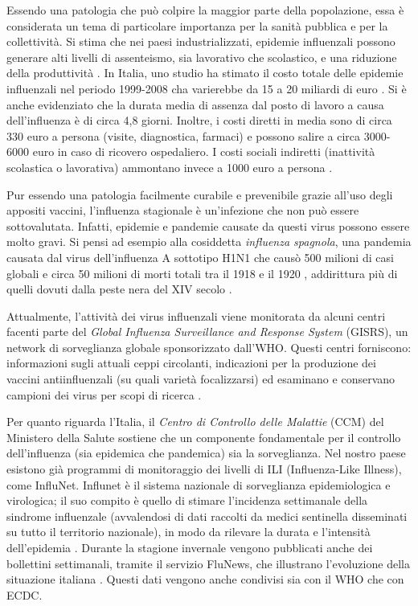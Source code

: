 Essendo una patologia che può colpire la maggior parte della popolazione, essa è considerata
un tema di particolare importanza per la sanità pubblica e per la collettività. Si stima che nei paesi industrializzati,
epidemie influenzali possono generare alti livelli di assenteismo, sia lavorativo che scolastico,
e una riduzione della produttività \cite{whoinfluenza_keyfacts}.
In Italia, uno studio ha stimato il costo totale delle epidemie influenzali nel periodo 1999-2008
cha varierebbe da 15 a 20 miliardi di euro \cite{PLLai2011}. Si è anche evidenziato che la durata media 
di assenza dal posto di lavoro a causa dell'influenza è di circa 4,8 giorni. 
Inoltre, i costi diretti in media sono di circa 330 euro a persona (visite, diagnostica, farmaci) e possono salire a circa 
3000-6000 euro in caso di ricovero ospedaliero.
I costi sociali indiretti (inattività scolastica o lavorativa) ammontano invece a 1000 euro a persona \cite{Sessa2005}.
\bigskip

Pur essendo una patologia facilmente curabile e prevenibile grazie all'uso degli appositi vaccini, 
l'influenza stagionale è un'infezione che non può essere sottovalutata. Infatti, epidemie e pandemie causate
da questi virus possono essere molto gravi. Si pensi ad esempio alla cosiddetta \textit{influenza spagnola},
una pandemia causata dal virus dell'influenza A sottotipo H1N1 che causò 500 milioni di casi globali e
circa 50 milioni di morti totali tra il 1918 e il 1920 \cite{taubenberger20061918}, addirittura più di quelli
dovuti dalla peste nera del XIV secolo \cite{JAM:JAM1492}.
\bigskip

Attualmente, l'attività dei virus influenzali viene monitorata da alcuni centri facenti
parte del \textit{Global Influenza Surveillance and Response System} (GISRS), un network di sorveglianza globale
sponsorizzato dall'WHO. Questi centri forniscono: informazioni sugli attuali ceppi circolanti, indicazioni
per la produzione dei vaccini antiinfluenzali (su quali varietà focalizzarsi) ed esaminano e conservano
campioni dei virus per scopi di ricerca \cite{whoinfluenza_surveillance}.
\bigskip

Per quanto riguarda l'Italia, il \textit{Centro di Controllo delle Malattie} (CCM) del Ministero della Salute sostiene
che un componente fondamentale per il controllo dell'influenza (sia epidemica che pandemica) sia la sorveglianza.
Nel nostro paese esistono già programmi di monitoraggio dei livelli di ILI (Influenza-Like Illness), come 
InfluNet. Influnet è il sistema nazionale di sorveglianza epidemiologica e virologica; il suo compito è quello di
stimare l'incidenza settimanale della sindrome influenzale (avvalendosi di dati raccolti da medici sentinella disseminati
su tutto il territorio nazionale), in modo da rilevare la durata e l'intensità dell'epidemia \cite{influnet}. Durante la 
stagione invernale vengono pubblicati anche dei bollettini settimanali, tramite il servizio FluNews, che illustrano 
l'evoluzione della situazione italiana \cite{influnet_bollettini}. Questi dati vengono anche condivisi sia con il WHO che con 
ECDC.
\bigskip

